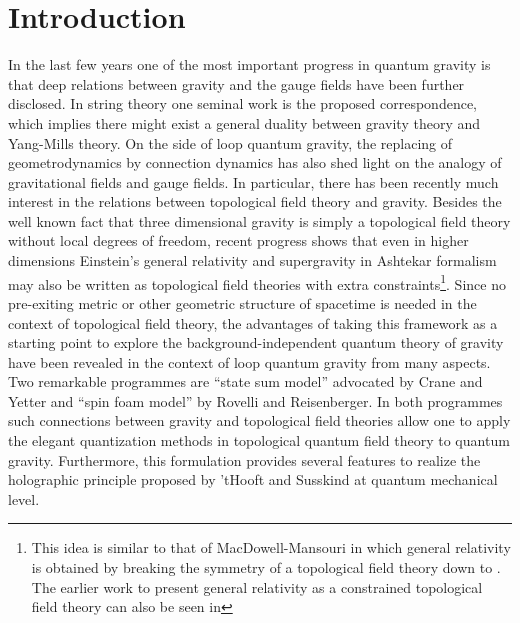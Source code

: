 \documentclass[a4paper,twocolumn,showpacs,prd]{revtex4}
\begin{document}

\keywords{}

\maketitle


\providecommand{\GForm}[2]{\buildrel\scriptstyle {#1} \over {\bf #2}}
\providecommand{\Form}[2]{\buildrel\scriptstyle {#1} \over #2}
\providecommand{\Gd}{{\bf d}}


\section{Introduction}
In the last few years one of the most important progress in
quantum gravity is that deep relations between gravity and the
gauge fields have been further disclosed. In string theory one
seminal work is the proposed \coordHE{}
correspondence\cite{Aharony:1999ti}, which implies there might
exist a general duality between gravity theory and Yang-Mills
theory.  On the side of loop quantum gravity, the replacing of
geometrodynamics by connection dynamics has also shed light on the
analogy of gravitational fields and gauge
fields\cite{Ashtekar:hf}. In particular, there has been recently
much interest in the relations between topological field theory
and gravity\cite{CraneYetter,linking}. Besides the well known fact
that three dimensional gravity is simply a topological field
theory without local degrees of freedom\cite{Witten}, recent
progress shows that even in higher dimensions Einstein's general
relativity and supergravity in Ashtekar formalism may also be
written as topological field theories with extra
constraints\cite{CDJM,CDJ,super-ezawa,Smolin,LingSmolin}\footnote{This
idea is similar to that of MacDowell-Mansouri \cite{MM,Mansouri}
in which general relativity is obtained by breaking the \coordHE{}
symmetry of a topological field theory down to \coordHE{}. The
earlier work to present general relativity as a constrained
topological field theory can also be seen in\cite{Plebanski}}.
Since no pre-exiting metric or other geometric structure of
spacetime is needed in the context of topological field theory,
the advantages of taking this framework as a starting point to
explore the background-independent quantum theory of gravity have
been revealed in the context of loop quantum gravity from many
aspects. Two remarkable programmes are ``state sum model''
advocated by Crane and Yetter\cite{CraneYetter} and ``spin foam
model'' by Rovelli and Reisenberger\cite{foam}.  In both
programmes such connections between gravity and topological field
theories allow one to apply the elegant quantization methods in
topological quantum field theory to quantum gravity. Furthermore,
this formulation provides several features to realize the
holographic principle proposed by 'tHooft and Susskind at quantum
mechanical level\cite{Smolin,LingSmolin}.
\end{document}
